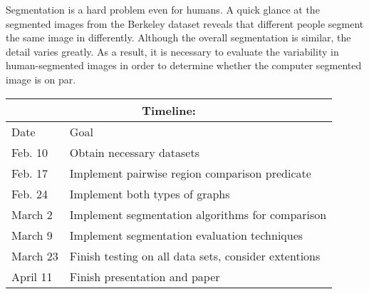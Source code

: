 Segmentation is a hard problem even for humans.  A quick glance at the segmented
images from the Berkeley dataset reveals that different people segment the same
image in differently.  Although the overall segmentation is similar, the detail
varies greatly.  As a result, it is necessary to evaluate the variability in
human-segmented images in order to determine whether the computer segmented
image is on par.
\\
\begin{center}
\begin{tabular}{|l|l|}
\hline
\multicolumn{2}{|c|}{Timeline:}\\
\hline
Date & Goal\\
\hline
Feb. 10 & Obtain necessary datasets \\
Feb. 17 & Implement pairwise region comparison predicate \\
Feb. 24 & Implement both types of graphs \\
March 2 & Implement segmentation algorithms for comparison \\
March 9 & Implement segmentation evaluation techniques \\
March 23 & Finish testing on all data sets, consider extentions \\
April 11 & Finish presentation and paper\\
\hline
\end{tabular}
\end{center}






